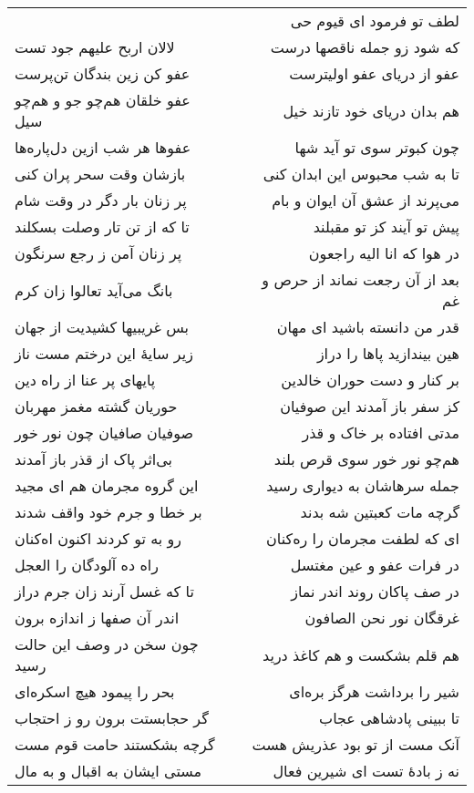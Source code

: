 \begin{center}
\begin{longtable}{l p{0.5cm} r}
&&
لطف تو فرمود ای قیوم حی
\\
لالان اربح علیهم جود تست
&&
که شود زو جمله ناقصها درست
\\
عفو کن زین بندگان تن‌پرست
&&
عفو از دریای عفو اولیترست
\\
عفو خلقان هم‌چو جو و هم‌چو سیل
&&
هم بدان دریای خود تازند خیل
\\
عفوها هر شب ازین دل‌پاره‌ها
&&
چون کبوتر سوی تو آید شها
\\
بازشان وقت سحر پران کنی
&&
تا به شب محبوس این ابدان کنی
\\
پر زنان بار دگر در وقت شام
&&
می‌پرند از عشق آن ایوان و بام
\\
تا که از تن تار وصلت بسکلند
&&
پیش تو آیند کز تو مقبلند
\\
پر زنان آمن ز رجع سرنگون
&&
در هوا که انا الیه راجعون
\\
بانگ می‌آید تعالوا زان کرم
&&
بعد از آن رجعت نماند از حرص و غم
\\
بس غریبیها کشیدیت از جهان
&&
قدر من دانسته باشید ای مهان
\\
زیر سایهٔ این درختم مست ناز
&&
هین بیندازید پاها را دراز
\\
پایهای پر عنا از راه دین
&&
بر کنار و دست حوران خالدین
\\
حوریان گشته مغمز مهربان
&&
کز سفر باز آمدند این صوفیان
\\
صوفیان صافیان چون نور خور
&&
مدتی افتاده بر خاک و قذر
\\
بی‌اثر پاک از قذر باز آمدند
&&
هم‌چو نور خور سوی قرص بلند
\\
این گروه مجرمان هم ای مجید
&&
جمله سرهاشان به دیواری رسید
\\
بر خطا و جرم خود واقف شدند
&&
گرچه مات کعبتین شه بدند
\\
رو به تو کردند اکنون اه‌کنان
&&
ای که لطفت مجرمان را ره‌کنان
\\
راه ده آلودگان را العجل
&&
در فرات عفو و عین مغتسل
\\
تا که غسل آرند زان جرم دراز
&&
در صف پاکان روند اندر نماز
\\
اندر آن صفها ز اندازه برون
&&
غرقگان نور نحن الصافون
\\
چون سخن در وصف این حالت رسید
&&
هم قلم بشکست و هم کاغذ درید
\\
بحر را پیمود هیچ اسکره‌ای
&&
شیر را برداشت هرگز بره‌ای
\\
گر حجابستت برون رو ز احتجاب
&&
تا ببینی پادشاهی عجاب
\\
گرچه بشکستند حامت قوم مست
&&
آنک مست از تو بود عذریش هست
\\
مستی ایشان به اقبال و به مال
&&
نه ز بادهٔ تست ای شیرین فعال

\end{longtable}
\end{center}
